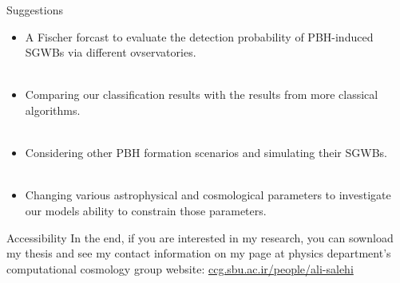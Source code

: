 \begin{frame}{Suggestions}
\begin{itemize}[<+->]
	\item A Fischer forcast to evaluate the detection probability of PBH-induced SGWBs via different ovservatories.\\~\\
	\item Comparing our classification results with the results from more classical algorithms.\\~\\
	\item Considering other PBH formation scenarios and simulating their SGWBs.\\~\\
	\item Changing various astrophysical and cosmological parameters to investigate our models ability to constrain those parameters.
\end{itemize}
\end{frame}

\begin{frame}{Accessibility}
In the end, if you are interested in my research, you can sownload my thesis and see my contact information on my page at physics department's computational cosmology group website:
\vskip 2cm
\centering
\LARGE \href{http://ccg.sbu.ac.ir/people/ali-salehi/}{ccg.sbu.ac.ir/people/ali-salehi}
\end{frame}

\begin{frame}[plain]
\begin{center}
\vspace*{5cm}
\contourlength{2pt} %
\\
\end{center}
\end{frame}